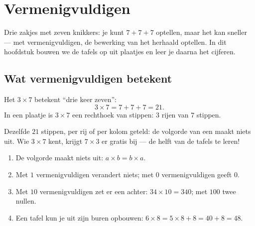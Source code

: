 \chapter{Vermenigvuldigen}\label{ch:g3:mult}

Drie zakjes met zeven knikkers: je kunt $7 + 7 + 7$ optellen, maar het
kan sneller --- met vermenigvuldigen, de bewerking van het herhaald
optellen. In dit hoofdstuk bouwen we de tafels op uit plaatjes en leer je
daarna het cijferen.

\section{Wat vermenigvuldigen betekent}

\begin{definition}[Vermenigvuldigen]\label{def:g3:mult:def}
Het  $3 \times 7$ betekent ``drie keer zeven'':
\[
3 \times 7 = 7 + 7 + 7 = 21 .
\]
In een plaatje is $3 \times 7$ een rechthoek van stippen: $3$ rijen van
$7$ stippen.
\end{definition}

\begin{omfigure}

{\small Dezelfde $21$ stippen, per rij of per kolom geteld: de volgorde
van een  maakt niets uit. Wie $3 \times 7$ kent, krijgt
$7 \times 3$ er gratis bij --- de helft van de tafels te leren!}
\end{omfigure}

\begin{proposition}[Regels die helpen]\label{prop:g3:mult:rules}
\begin{enumerate}
  \item De volgorde maakt niets uit: $a \times b = b \times a$.
  \item Met $1$ vermenigvuldigen verandert niets; met $0$
        vermenigvuldigen geeft $0$.
  \item Met $10$ vermenigvuldigen zet er een  achter:
        $34 \times 10 = 340$; met $100$ twee nullen.
  \item Een tafel kun je uit zijn buren opbouwen:
        $6 \times 8 = 5 \times 8 + 8 = 40 + 8 = 48$.
\end{enumerate}
\end{proposition}
\admitted


